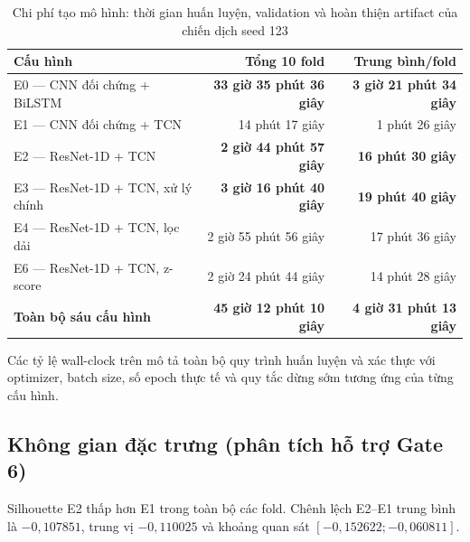\begin{table}[H]
\centering
\caption{Chi phí tạo mô hình: thời gian huấn luyện, validation và hoàn thiện artifact của chiến dịch seed 123}
\label{tab:training_runtime}
\begin{tabularx}{\textwidth}{Yrr}
\toprule
\textbf{Cấu hình} & \textbf{Tổng 10 fold} & \textbf{Trung bình/fold} \\
\midrule
E0 --- CNN đối chứng + BiLSTM & \textbf{33 giờ 35 phút 36 giây} & \textbf{3 giờ 21 phút 34 giây} \\
E1 --- CNN đối chứng + TCN & 14 phút 17 giây & 1 phút 26 giây \\
E2 --- ResNet-1D + TCN & \textbf{2 giờ 44 phút 57 giây} & \textbf{16 phút 30 giây} \\
E3 --- ResNet-1D + TCN, xử lý chính & \textbf{3 giờ 16 phút 40 giây} & \textbf{19 phút 40 giây} \\
E4 --- ResNet-1D + TCN, lọc dải & 2 giờ 55 phút 56 giây & 17 phút 36 giây \\
E6 --- ResNet-1D + TCN, z-score & 2 giờ 24 phút 44 giây & 14 phút 28 giây \\
\midrule
\textbf{Toàn bộ sáu cấu hình} & \textbf{45 giờ 12 phút 10 giây} & \textbf{4 giờ 31 phút 13 giây} \\
\bottomrule
\end{tabularx}
\end{table}

\noindent{}

Các tỷ lệ wall-clock trên mô tả toàn bộ quy trình huấn luyện và xác thực với optimizer, batch size, số epoch thực tế và quy tắc dừng sớm tương ứng của từng cấu hình.

\subsection{Không gian đặc trưng (phân tích hỗ trợ Gate 6)}

Silhouette E2 thấp hơn E1 trong toàn bộ các fold. Chênh lệch E2--E1 trung bình là $-0,107851$, trung vị $-0,110025$ và khoảng quan sát $[-0,152622;-0,060811]$.

